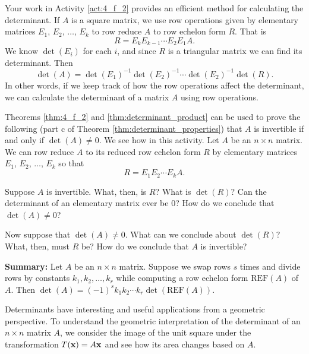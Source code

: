Your work in Activity \ref{act:4_f_2} provides an efficient method for calculating the determinant. If $A$ is a square matrix, we use row operations given by elementary matrices $E_1$, $E_2$, $\ldots$, $E_k$ to row reduce $A$ to row echelon form $R$. That is
\[R = E_kE_{k-1} \cdots E_2E_1A.\]
We know $\det(E_i)$ for each $i$, and since $R$ is a triangular matrix we can find its determinant. Then
\[\det(A) = \det(E_1)^{-1}\det(E_2)^{-1} \cdots \det(E_2)^{-1}\det(R).\]
In other words, if we keep track of how the row operations affect the determinant, we can calculate the determinant of a matrix $A$ using row operations. 




\begin{activity} \label{act:4_f_2_b} Theorems \ref{thm:4_f_2} and \ref{thm:determinant_product} can be used to prove the following (part c of Theorem \ref{thm:determinant_properties}) that $A$ is invertible if and only if $\det(A) \neq 0$. We see how in this activity. Let $A$ be an $n \times n$ matrix. We can row reduce $A$ to its reduced row echelon form $R$ by elementary matrices $E_1$, $E_2$, $\ldots$, $E_k$ so that 
\[R = E_1E_2 \cdots E_kA.\]
\ba 
\item Suppose $A$ is invertible. What, then, is $R$? What is $\det(R)$? Can the determinant of an elementary matrix ever be $0$? How do we conclude that $\det(A) \neq 0$?
\item Now suppose that $\det(A) \neq 0$. What can we conclude about $\det(R)$? What, then, must $R$ be? How do we conclude that $A$ is invertible? 
\ea 
\end{activity}

\noindent \textbf{Summary: } Let $A$ be an $n\times n$ matrix. Suppose we swap rows $s$ times and divide rows by constants $k_1, k_2, \ldots, k_r$ while computing a row echelon form $\text{REF}(A)$ of $A$. Then $\det(A)=(-1)^s k_1 k_2\cdots k_r \det(\text{REF}(A))$.


Determinants have interesting and useful applications from a geometric perspective. To understand the geometric interpretation of the determinant of an $n\times n$ matrix $A$, we consider the image of the unit square under the transformation $T(\mathbf{x})=A\mathbf{x}$ and see how its area changes based on $A$.



